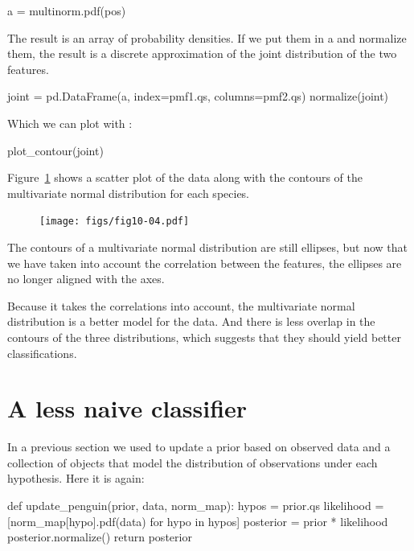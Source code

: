 \documentclass[12pt]{book}
\theoremstyle{exercise}
\begin{document}
\begin{code}
a = multinorm.pdf(pos)
\end{code}

The result is an array of probability densities. If we put them in a
 and normalize them, the result is a
discrete approximation of the joint distribution of the two features.

\begin{code}
joint = pd.DataFrame(a, index=pmf1.qs, columns=pmf2.qs)
normalize(joint)
\end{code}

Which we can plot with :

\begin{code}
plot_contour(joint)
\end{code}

Figure~\ref{fig10-04} shows a scatter plot of the data along with the
contours of the multivariate normal distribution for each species.

\begin{figure}
\centerline{\texttt{[image: figs/fig10-04.pdf]}}
\caption{}
\label{fig10-04}
\end{figure}

The contours of a multivariate normal distribution are still ellipses,
but now that we have taken into account the correlation between the
features, the ellipses are no longer aligned with the axes.

Because it takes the correlations into account, the multivariate normal
distribution is a better model for the data. And there is less overlap
in the contours of the three distributions, which suggests that they
should yield better classifications.

\section{A less naive classifier}
\label{a-less-naive-classifier}

In a previous section we used 
to update a prior  based on observed data
and a collection of  objects that model
the distribution of observations under each hypothesis. Here it is
again:

\begin{code}
def update_penguin(prior, data, norm_map):
    hypos = prior.qs
    likelihood = [norm_map[hypo].pdf(data) for hypo in hypos]
    posterior = prior * likelihood
    posterior.normalize()
    return posterior
\end{code}
\end{document}
